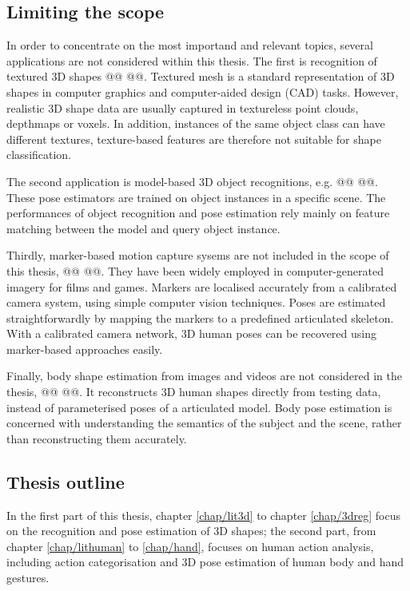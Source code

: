 \subsection{Limiting the scope}

In order to concentrate on the most importand and relevant topics, 
several applications are not considered within this thesis. 
The first is recognition of textured 3D shapes @@ @@. Textured mesh is a standard representation of 3D shapes in computer graphics and computer-aided design (CAD) tasks. However, realistic 3D shape data are usually captured in textureless point clouds, depthmaps or voxels. In addition, instances of the same object class can have different textures, texture-based features are therefore not suitable for shape classification.      

The second application is model-based 3D object recognitions, e.g. @@ @@. These pose estimators are trained on object instances in a specific scene. The performances of object recognition and pose estimation rely mainly on feature matching between the model and query object instance. 

Thirdly, marker-based motion capture sysems are not included in the scope of this thesis, @@ @@. They have been widely employed in computer-generated imagery for films and games. Markers are localised accurately from a calibrated camera system, using simple computer vision techniques. Poses are estimated straightforwardly by mapping the markers to a predefined articulated skeleton.
 With a calibrated camera network, 3D human poses can be recovered using marker-based approaches easily.  

Finally, body shape estimation from images and videos are not considered in the thesis, @@ @@. It reconstructs 3D human shapes directly from testing data, instead of parameterised poses of a articulated model. Body pose estimation is concerned with understanding the semantics of the subject and the scene, rather than reconstructing them accurately. 

\subsection{Thesis outline}

In the first part of this thesis, chapter \ref{chap/lit3d} to chapter \ref{chap/3dreg} focus on the recognition and pose estimation of 3D shapes; the second part, from chapter \ref{chap/lithuman} to \ref{chap/hand}, focuses on human action analysis, including action categorisation and 3D pose estimation of human body and hand gestures.  

